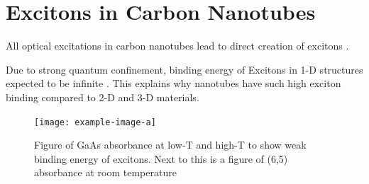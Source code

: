 \section{Excitons in Carbon Nanotubes}
All optical excitations in carbon nanotubes lead to direct creation of excitons \cite{wang2005optical}.

Due to strong quantum confinement, binding energy of Excitons in 1-D structures expected to be infinite \cite{ando2005theory}. This explains why nanotubes have such high exciton binding compared to 2-D and 3-D materials. 
 
\begin{figure}[h]
	\centering
	\texttt{[image: example-image-a]}
	\caption{Figure of GaAs absorbance at low-T and high-T to show weak binding energy of excitons. Next to this is a figure of  (6,5) absorbance at room temperature}
	\label{fig:gaas_vs_cnt_absorbance}
\end{figure}
